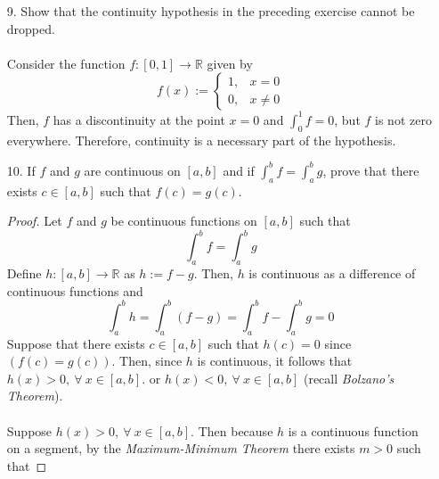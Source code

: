 \documentclass[12pt,letterpaper]{article}
\newcommand{\R}{\mathbb{R}}
\theoremstyle{case}
\theoremstyle{definition}
\begin{document}
\begin{enumerate}
\begin{enumerate}
\begin{proof}
				\[\int_{a}^{b}f \geq \int_{c-\delta}^{c+\delta} f \geq \frac{1}{2} f(c) \cdot 2 \delta > 0\]
				which contradicts the fact that $\int_{a}^{b}f=0$. If $c=a$, then there exists $\delta >0$ such that $f(x)>0$ for $x \in [a,a+\delta)$, and thus the same contradiction is present. The same applies for the case in which $a=b$. Therefore we have that $f(x)=0,\ \forall\ x \in [a,b]$.
			\end{proof}
			\item[9.] Show that the continuity hypothesis in the preceding exercise cannot be dropped.
			\\\\Consider the function $f:[0,1] \to \R$ given by
			\[f(x):=\begin{cases}
			1, &x = 0\\
			0, & x \neq 0
			\end{cases}\]
			Then, $f$ has a discontinuity at the point $x=0$ and $\int_{0}^{1} f=0$, but $f$ is not zero everywhere. Therefore, continuity is a necessary part of the hypothesis.\\
			\item[10.] If $f$ and $g$ are continuous on $[a,b]$ and if $\int_{a}^{b}f = \int_{a}^{b}g$, prove that there exists $c \in [a,b]$ such that $f(c)=g(c)$.
			\begin{proof}
				Let $f$ and $g$ be continuous functions on $[a,b]$ such that
				\[\int_{a}^{b}f = \int_{a}^{b} g\]
				Define $h:[a,b] \to \R$ as $h:=f-g$. Then, $h$ is continuous as a difference of continuous functions and
				\[\int_{a}^{b}h=\int_{a}^{b} (f-g)=\int_{a}^{b}f-\int_{a}^{b}g=0\]
				Suppose that there exists $c \in [a,b]$ such that $h(c)=0$ since $(f(c)=g(c))$. Then, since $h$ is continuous, it follows that $h(x)>0,\ \forall\ x \in [a,b]$. or $h(x)<0,\ \forall\ x \in [a,b]$ (recall \textit{Bolzano's Theorem}).
				\\\\Suppose $h(x)>0,\ \forall\ x \in [a,b]$. Then because $h$ is a continuous function on a segment, by the \textit{Maximum-Minimum Theorem} there exists $m>0$ such that

\end{proof}
\end{enumerate}
\end{enumerate}
\end{document}
